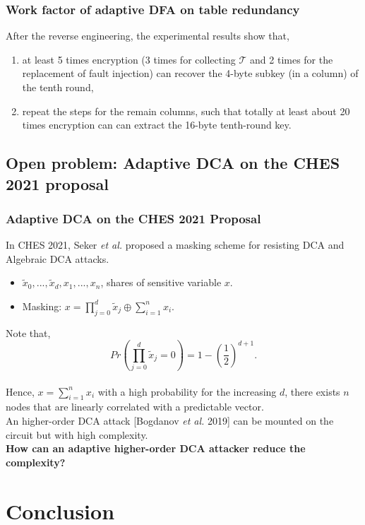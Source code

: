 \documentclass{beamer}
\begin{document}
\frame
{
	\frametitle{Work factor of adaptive DFA on table redundancy}
	After the reverse engineering, the experimental results show that,
	\begin{enumerate}[1.]
		\item at least 5 times encryption (3 times for collecting $\mathcal{T}$ and 2 times for the replacement of fault injection) can recover the 4-byte subkey (in a column) of the tenth round,
		\item repeat the steps for the remain columns, such that totally at least about 20 times encryption can can extract the 16-byte tenth-round key.
	\end{enumerate}
}


\subsection{Open problem: Adaptive DCA on the CHES 2021 proposal}
\frame
{
	\frametitle{Adaptive DCA on the CHES 2021 Proposal}
	In CHES 2021, Seker \textit{et al.} proposed a masking scheme for resisting DCA and Algebraic DCA attacks.
	\\[2ex]
	\begin{itemize}
		\item $\tilde{x}_0,...,\tilde{x}_d,x_1,...,x_n$, shares of sensitive variable $x$.
		\item Masking: $x=\prod_{j=0}^{d}\tilde{x}_j\oplus \sum_{i=1}^{n}x_i$.
	\end{itemize}
}
\frame
{
	Note that,
	\[Pr(\prod_{j=0}^{d}\tilde{x}_j=0)=1-(\frac{1}{2})^{d+1}.\]
	\\[2ex]
	Hence, $x=\sum_{i=1}^{n}x_i$ with a high probability for the increasing $d$, there exists $n$ nodes that are linearly correlated with a predictable vector.
	\\[2ex]
	An higher-order DCA attack [Bogdanov \textit{et al.} 2019] can be mounted on the circuit but with high complexity.
	\\[2ex]
	\textbf{How can an adaptive higher-order DCA attacker reduce the complexity?}
}

\section{Conclusion}

\end{document}
